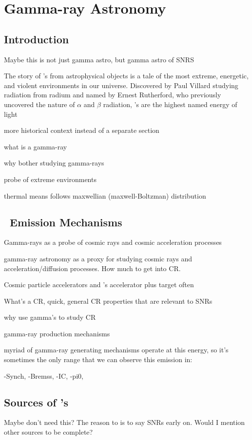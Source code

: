 \chapter{Gamma-ray Astronomy }
\label{chap:gamAstr}

\section{Introduction}\label{gamAstr:intro}
Maybe this is not just gamma astro, but gamma astro of SNRS

The story of \gam 's from astrophysical objects is a tale of the most extreme, energetic, and violent environments in our universe. Discovered by Paul Villard studying radiation from radium and named by Ernest Rutherford, who previously uncovered the nature of $\alpha$ and $\beta$ radiation, \gam's are the highest named energy of light 

more historical context instead of a separate section


what is a gamma-ray

why bother studying gamma-rays

probe of extreme environments

thermal means follows maxwellian (maxwell-Boltzman) distribution

\section{\gam~Emission Mechanisms }\label{gamAstr:CR}
Gamma-rays as a probe of cosmic rays and cosmic acceleration processes

gamma-ray astronomy as  a proxy for studying cosmic rays and acceleration/diffusion processes. How much to get into CR. 

Cosmic particle accelerators and \gam's
accelerator plus target often 


What's a CR, quick,  general CR properties that are relevant to SNRs

why use gamma's  to study CR

gamma-ray production mechanisms

myriad of gamma-ray generating mechanisms operate at this energy, so it's sometimes the only range that we can observe this emission in:

-Synch,
-Bremss,
-IC,
-pi0,

\section{Sources of \gam's}\label{gamAstr:Sources}
Maybe don't need this? The reason to is to say SNRs early on. Would I mention other sources to be complete?


